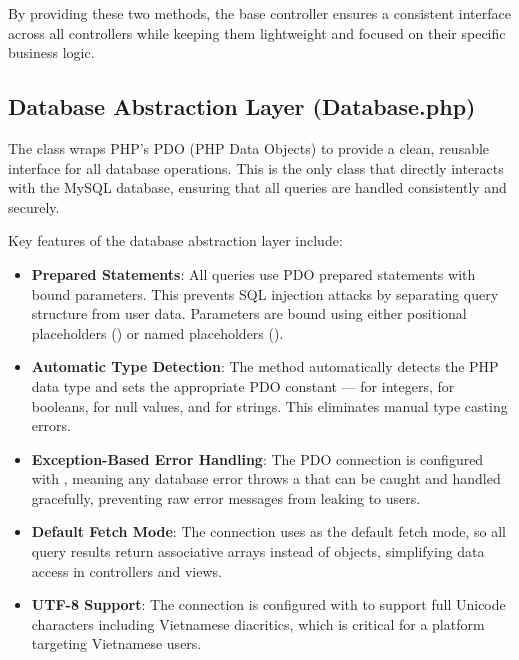 \documentclass[12pt,a4paper]{report}
\begin{document}
By providing these two methods, the base controller ensures a consistent interface across all controllers while keeping them lightweight and focused on their specific business logic.

\subsection{Database Abstraction Layer (Database.php)}

The  class wraps PHP's PDO (PHP Data Objects) to provide a clean, reusable interface for all database operations. This is the only class that directly interacts with the MySQL database, ensuring that all queries are handled consistently and securely.

Key features of the database abstraction layer include:

\begin{itemize}
    \item \textbf{Prepared Statements}: All queries use PDO prepared statements with bound parameters. This prevents SQL injection attacks by separating query structure from user data. Parameters are bound using either positional placeholders () or named placeholders ().
    
    \item \textbf{Automatic Type Detection}: The  method automatically detects the PHP data type and sets the appropriate PDO constant —  for integers,  for booleans,  for null values, and  for strings. This eliminates manual type casting errors.
    
    \item \textbf{Exception-Based Error Handling}: The PDO connection is configured with , meaning any database error throws a  that can be caught and handled gracefully, preventing raw error messages from leaking to users.
    
    \item \textbf{Default Fetch Mode}: The connection uses  as the default fetch mode, so all query results return associative arrays instead of objects, simplifying data access in controllers and views.
    
    \item \textbf{UTF-8 Support}: The connection is configured with  to support full Unicode characters including Vietnamese diacritics, which is critical for a platform targeting Vietnamese users.
\end{itemize}
\end{document}
